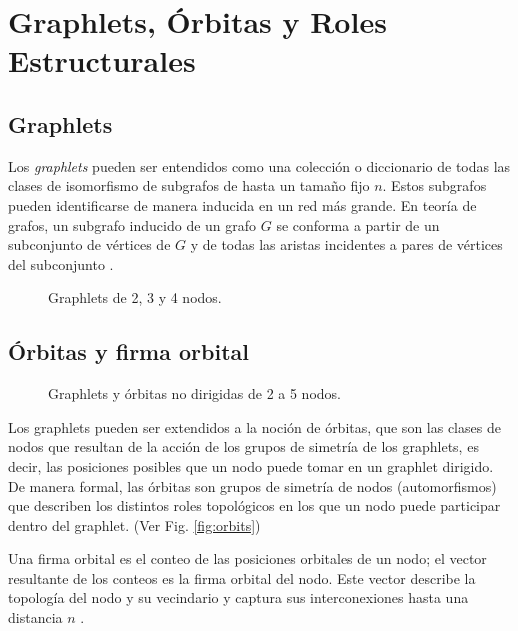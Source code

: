 
\chapter{Graphlets, Órbitas y Roles Estructurales}
\label{chapter:graphlets}

\section{Graphlets}


Los \textit{graphlets} pueden ser entendidos como una colección o diccionario de todas las clases de isomorfismo de subgrafos de hasta un tamaño fijo $n$. Estos subgrafos pueden identificarse de manera inducida en un red más grande. En teoría de grafos, un subgrafo inducido de un grafo $G$ se conforma a partir de un subconjunto de vértices de $G$ y de todas las aristas incidentes a pares de vértices del subconjunto \cite{przulj_biological_2007}.


 \begin{figure}[htbp]
   \centering
   
    \caption{Graphlets de 2, 3 y 4 nodos.}
    \label{fig:small-graphlets}
\end{figure}

\section{Órbitas y firma orbital}

 \begin{figure}[htbp]
   \centering
   
    \caption{Graphlets y órbitas no dirigidas de 2 a 5 nodos.}
    \label{fig:orcaorbits}
\end{figure}

Los graphlets pueden ser extendidos a la noción de órbitas, que son las clases de nodos que resultan de la acción de los grupos de simetría de los graphlets, es decir, las posiciones posibles que un nodo puede tomar en un graphlet dirigido. De manera formal, las órbitas son grupos de simetría de nodos (automorfismos) \cite{sarajlic_graphlet-based_2016} que describen los distintos roles topológicos en los que un nodo puede participar dentro del graphlet. (Ver Fig. \ref{fig:orbits})

Una firma orbital es el conteo de las posiciones orbitales de un nodo; el vector resultante de los conteos es la firma orbital del nodo. Este vector describe la topología del nodo y su vecindario y captura sus interconexiones hasta una distancia $n$ \cite{sarajlic_graphlet-based_2016}.

